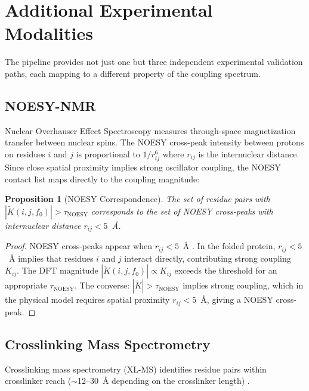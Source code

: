 \documentclass[11pt,twocolumn,a4paper]{article}
\newtheorem{proposition}[theorem]{Proposition}
\theoremstyle{definition}
\theoremstyle{remark}
\newcommand{\Ktilde}{\tilde{K}}
\begin{document}
\section{Additional Experimental Modalities}
\label{sec:additional_experimental}

The pipeline provides not just one but three independent experimental validation paths, each mapping to a different property of the coupling spectrum.

\subsection{NOESY-NMR}

Nuclear Overhauser Effect Spectroscopy \citep{wuthrich1986} measures through-space magnetization transfer between nuclear spins. The NOESY cross-peak intensity between protons on residues $i$ and $j$ is proportional to $1/r_{ij}^6$ where $r_{ij}$ is the internuclear distance. Since close spatial proximity implies strong oscillator coupling, the NOESY contact list maps directly to the coupling magnitude:

\begin{proposition}[NOESY Correspondence]
\label{prop:noesy}
The set of residue pairs with $|\Ktilde(i, j, f_0)| > \tau_{\text{NOESY}}$ corresponds to the set of NOESY cross-peaks with internuclear distance $r_{ij} < 5$~\AA.
\end{proposition}

\begin{proof}
NOESY cross-peaks appear when $r_{ij} < 5$~\AA{} \citep{wuthrich1986}. In the folded protein, $r_{ij} < 5$~\AA{} implies that residues $i$ and $j$ interact directly, contributing strong coupling $K_{ij}$. The DFT magnitude $|\Ktilde(i,j,f_0)| \propto K_{ij}$ exceeds the threshold for an appropriate $\tau_{\text{NOESY}}$. The converse: $|\Ktilde| > \tau_{\text{NOESY}}$ implies strong coupling, which in the physical model requires spatial proximity $r_{ij} < 5$~\AA, giving a NOESY cross-peak.
\end{proof}

\subsection{Crosslinking Mass Spectrometry}

Crosslinking mass spectrometry (XL-MS) identifies residue pairs within crosslinker reach ($\sim$12--30~\AA{} depending on the crosslinker length) \citep{leitner2016}.
\end{document}
